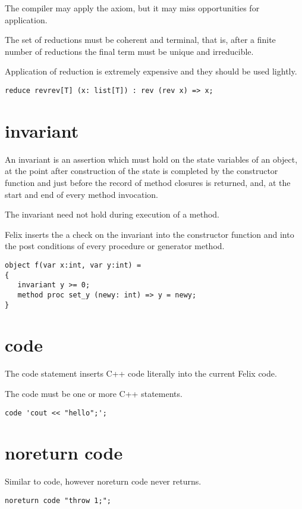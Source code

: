 \documentclass[oneside]{book}
\begin{document}
The compiler may apply the axiom, but it may miss opportunities
for application.

The set of reductions must be coherent and terminal, 
that is, after a finite number of reductions the final
term must be unique and irreducible. 

Application of reduction is extremely expensive and they
should be used lightly.

\begin{verbatim}
reduce revrev[T] (x: list[T]) : rev (rev x) => x;
\end{verbatim}



\section{invariant}
An invariant is an assertion which must hold on the state variables
of an object, at the point after construction of the state
is completed by the constructor function and just before the
record of method closures is returned, and, at the start and
end of every method invocation.

The invariant need not hold during execution of a method.

Felix inserts the a check on the invariant into the constructor function
and into the post conditions of every procedure or generator
method.


\begin{verbatim}
object f(var x:int, var y:int) =
{
   invariant y >= 0;
   method proc set_y (newy: int) => y = newy;
}
\end{verbatim}


\section{code}
The code statement inserts C++ code literally into the current
Felix code.

The code must be one or more C++ statements.


\begin{verbatim}
code 'cout << "hello";';
\end{verbatim}


\section{noreturn code}
Similar to code, however noreturn code never returns.

\begin{verbatim}
noreturn code "throw 1;";
\end{verbatim}
\end{document}
